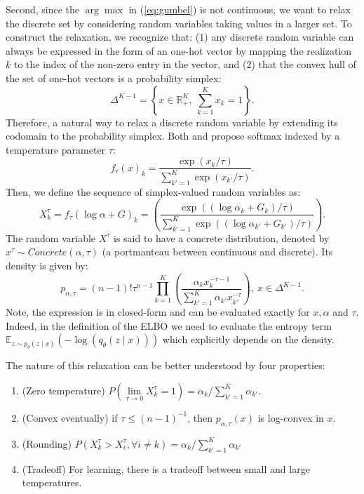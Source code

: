 \documentclass[11pt]{article}
\def\E{\mathbb{E}}
\begin{document}
Second, since the $\arg\max$ in (\ref{eq:gumbel}) is not continuous, we want to relax the discrete set by considering random variables taking values in a larger set. To construct the relaxation, we recognize that: (1) any discrete random variable can always be expressed in the form of an one-hot vector by mapping the realization $k$ to the index of the non-zero entry in the vector, and (2) that the convex hull of the set of one-hot vectors is a probability simplex:
\begin{equation}
\Delta^{K-1} = \left\{ x \in \mathbb{R}_+^K,\: \sum_{k=1}^K x_k=1 \right\}.
\end{equation}
Therefore, a natural way to relax a discrete random variable by extending its codomain to the probability simplex. Both \cite{MaddisonMT16} and \cite{jang2016categorical} propose softmax indexed by a temperature parameter $\tau$:
\begin{equation}
f_\tau(x)_k = \frac{ \exp(x_k/\tau) }{ \sum_{k'=1}^K\exp(x_{k'}/\tau) }.
\end{equation}
Then, we define the sequence of simplex-valued random variables as:
\begin{equation}
X^\tau_k = f_\tau(\log\alpha+G)_k = \left( \frac{\exp((\log\alpha_k+G_k)/\tau)}{\sum_{k'=1}^K\exp((\log\alpha_{k'}+G_{k'})/\tau)} \right).
\end{equation}
The random variable $X^\tau$ is said to have a concrete distribution, denoted by $x^\tau\sim Concrete(\alpha,\tau)$ (a portmanteau between continuous and discrete). Its density is given by:
\begin{equation}
p_{\alpha,\tau} = (n-1)!\tau^{n-1}\prod_{k=1}^K\left( \frac{\alpha_k x_k^{-\tau-1}}{\sum_{k'=1}^K \alpha_{k'} x_{k'}^{-\tau}} \right),\:x\in\Delta^{K-1}.
\end{equation}
Note, the expression is in closed-form and can be evaluated exactly for $x,\alpha$ and $\tau$. Indeed, in the definition of the ELBO we need to evaluate the entropy term $\E_{z\sim p_\theta(z\mid x)}(-\log(q_\theta(z\mid x)))$ which explicitly depends on the density.

The nature of this relaxation can be better understood by four properties:
\begin{enumerate}
\item (Zero temperature) $P(\underset{\tau\rightarrow0}{\lim}X_k^\tau=1) = \alpha_k / \sum_{k'=1}^K\alpha_{k'}$.
\item (Convex eventually) if $\tau\leq(n-1)^{-1}$, then $p_{\alpha,\tau}(x)$ is log-convex in $x$.
\item (Rounding) $P(X_k^\tau>X_i^\tau,\forall i\neq k) =  \alpha_k / \sum_{k'=1}^K\alpha_{k'}$
\item (Tradeoff) For learning, there is a tradeoff between small and large temperatures.
\end{enumerate}
\end{document}
